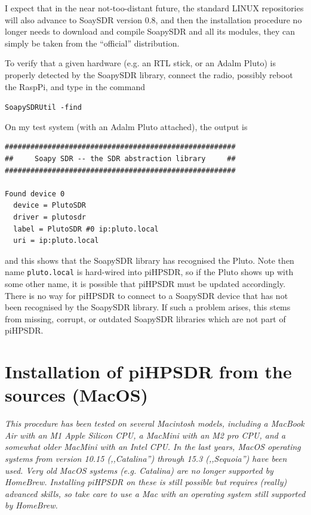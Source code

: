 \documentclass[12pt]{book}
\def\grtt#1{\texttt{\color{magenta}#1}}
\def\pH{pi\-HPSDR\xspace}
\begin{document}
I expect that in the near not-too-distant future, the standard LINUX
repositories will also advance to SoaySDR version 0.8, and then
the installation procedure no longer needs to download and compile SoapySDR and all
its modules, they can simply be taken from the ``official'' distribution.

\bigskip

To verify that a given hardware (e.g. an RTL stick, or an Adalm Pluto) is properly detected by the
SoapySDR library, connect the radio, possibly reboot the RaspPi, and type in the command

\grtt{SoapySDRUtil -find}

On my test system (with an Adalm Pluto attached), the output is

\begin{small}
\begin{verbatim}
######################################################
##     Soapy SDR -- the SDR abstraction library     ##
######################################################

Found device 0
  device = PlutoSDR
  driver = plutosdr
  label = PlutoSDR #0 ip:pluto.local
  uri = ip:pluto.local
\end{verbatim}
\end{small}

and this shows that the SoapySDR library has recognised the Pluto. Note then name \texttt{pluto.local}
is hard-wired into \pH, so if the Pluto shows up with some other name, it is possible that
\pH must be updated accordingly. There is no way for \pH to connect
to a SoapySDR device that has not been recognised by the SoapySDR library. If such a problem arises, this
stems from missing, corrupt, or outdated SoapySDR libraries which are not part of \pH.

\chapter[MacOS: \pH install from sources]{Installation of \pH from the sources (MacOS)}
\label{sec:installmacosx}

\textit{This procedure has been tested on several Macintosh models, including a MacBook Air with an
M1 Apple Silicon CPU, a MacMini with an M2 pro CPU, and a somewhat older MacMini with an Intel CPU.
In the last years, MacOS operating systems from version 10.15 (,,Catalina'') through 15.3 (,,Sequoia'')
have been used. Very old MacOS systems (e.g. Catalina) are no longer supported by HomeBrew. Installing
\pH on these is still possible but requires (really) advanced skills, so take care to use a Mac with an operating
system still supported by HomeBrew.}
\end{document}
